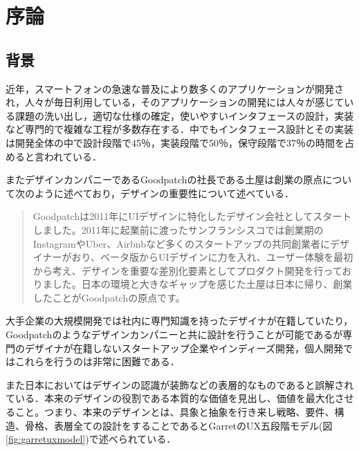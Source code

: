 \chapter{序論}
\label{chap:introduction}

\section{背景}

近年，スマートフォンの急速な普及により数多くのアプリケーションが開発され，人々が毎日利用している，そのアプリケーションの開発には人々が感じている課題の洗い出し，適切な仕様の確定，使いやすいインタフェースの設計，実装など専門的で複雑な工程が多数存在する．中でもインタフェース設計とその実装は開発全体の中で設計段階で45％，実装段階で50％，保守段階で37％の時間を占めると言われている．\cite{myers1992survey}

またデザインカンパニーであるGoodpatchの社長である土屋は創業の原点について次のように述べており，デザインの重要性について述べている．\begin{quotation}
Goodpatchは2011年にUIデザインに特化したデザイン会社としてスタートしました。2011年に起業前に渡ったサンフランシスコでは創業期のInstagramやUber、Airbnbなど多くのスタートアップの共同創業者にデザイナーがおり、ベータ版からUIデザインに力を入れ、ユーザー体験を最初から考え、デザインを重要な差別化要素としてプロダクト開発を行っておりました。日本の環境と大きなギャップを感じた土屋は日本に帰り、創業したことがGoodpatchの原点です。\cite{goodpatchwhydesign}
\end{quotation}


大手企業の大規模開発では社内に専門知識を持ったデザイナが在籍していたり，Goodpatchのようなデザインカンパニーと共に設計を行うことが可能であるが専門のデザイナが在籍しないスタートアップ企業やインディーズ開発，個人開発ではこれらを行うのは非常に困難である．


また日本においてはデザインの認識が装飾などの表層的なものであると誤解されている．\cite{goodpatchwhydesign}本来のデザインの役割である本質的な価値を見出し、価値を最大化させること。つまり、本来のデザインとは、具象と抽象を行き来し戦略、要件、構造、骨格、表層全ての設計をすることであるとGarretのUX五段階モデル(図\ref{fig:garretuxmodel})で述べられている．

